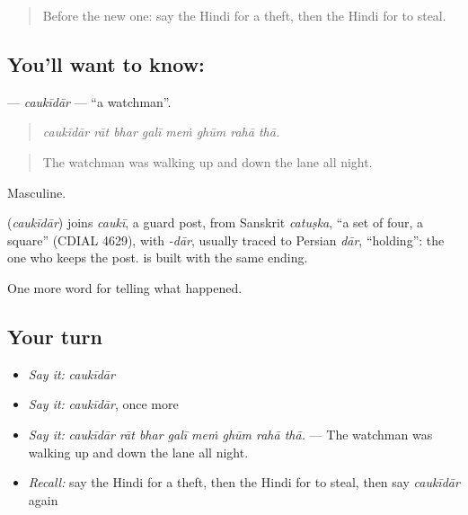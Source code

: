 \label{lesson:HI-C288-caukidar}



\begin{quote}
Before the new one: say the Hindi for a theft, then the Hindi for to steal.
\end{quote}

\subsection*{You'll want to know: }
\textbf{} — \emph{caukīdār} — \textquotedblleft{}a watchman\textquotedblright{}.

\begin{quote}
       
\end{quote}

\begin{quote}
\emph{caukīdār rāt bhar galī meṁ ghūm rahā thā.}
\end{quote}

\begin{quote}
The watchman was walking up and down the lane all night.
\end{quote}

Masculine.

\begin{cousinweb}
\textbf{} (\emph{caukīdār}) joins \emph{caukī}, a guard post, from Sanskrit \emph{catuṣka}, \textquotedblleft{}a set of four, a square\textquotedblright{} (CDIAL 4629), with \emph{-dār}, usually traced to Persian \emph{dār}, \textquotedblleft{}holding\textquotedblright{}: the one who keeps the post. \textbf{} is built with the same ending.
\end{cousinweb}

\begin{grammarlens}[title={What you've built}]
One more word for telling what happened.
\end{grammarlens}

\subsection*{Your turn}
\begin{itemize}
\raggedright
  \item \emph{Say it:} \emph{caukīdār}
  \item \emph{Say it:} \emph{caukīdār}, once more
  \item \emph{Say it:} \emph{caukīdār rāt bhar galī meṁ ghūm rahā thā.} — The watchman was walking up and down the lane all night.
  \item \emph{Recall:} say the Hindi for a theft, then the Hindi for to steal, then say \emph{caukīdār} again
\end{itemize}

